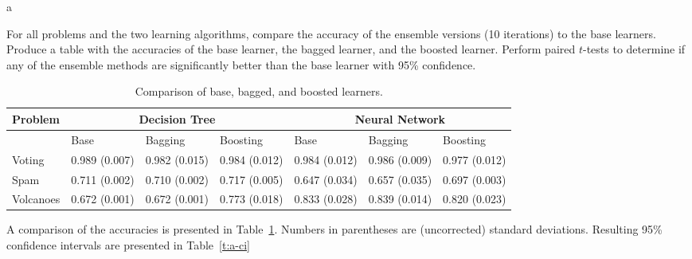 \documentclass[fleqn]{homework}
\begin{document}
  \maketitle

  \begin{problem}{a}
    \begin{question}
      For all problems and the two learning algorithms, compare the accuracy of
      the ensemble versions (10 iterations) to the base learners. Produce a
      table with the accuracies of the base learner, the bagged learner, and the
      boosted learner. Perform paired $t$-tests to determine if any of the
      ensemble methods are significantly better than the base learner with 95\%
      confidence.
    \end{question}
    \FloatBarrier

    \begin{table}[h]
    \centering
    \caption{Comparison of base, bagged, and boosted learners.}
    \label{t:a-comparison}
    \begin{tabular}{lllllll}
      \toprule
      Problem & \multicolumn{3}{c}{Decision Tree} & \multicolumn{3}{c}{Neural Network} \\
      \midrule
             & Base          & Bagging       & Boosting      & Base          & Bagging      & Boosting       \\
      Voting & 0.989 (0.007) & 0.982 (0.015) & 0.984 (0.012) & 0.984 (0.012) & 0.986 (0.009) & 0.977 (0.012) \\
      Spam   & 0.711 (0.002) & 0.710 (0.002) & 0.717 (0.005) & 0.647 (0.034) & 0.657 (0.035) & 0.697 (0.003) \\
      Volcanoes&0.672 (0.001)& 0.672 (0.001) & 0.773 (0.018) & 0.833 (0.028) & 0.839 (0.014) & 0.820 (0.023) \\
      \bottomrule
    \end{tabular}
    \end{table}

    A comparison of the accuracies is presented in Table~\ref{t:a-comparison}.
    Numbers in parentheses are (uncorrected) standard deviations.  Resulting
    95\% confidence intervals are presented in Table~\ref{t:a-ci}


\end{problem}
\end{document}
